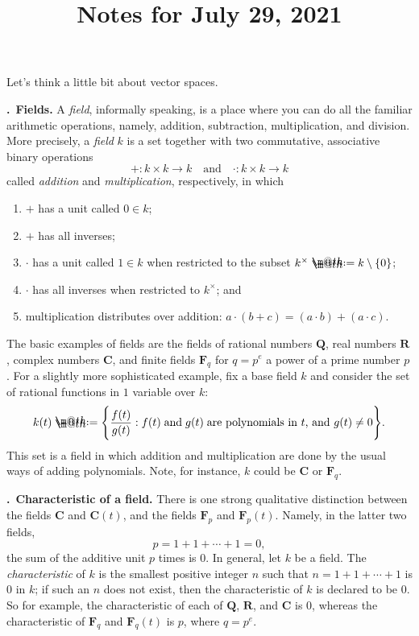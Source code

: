 \documentclass[11pt, noamsfonts]{amsart}
\title{Notes for July 29, 2021}
\makeatletter
\newcommand{\pointheader}{\vspace{2mm}\noindent\refstepcounter{section}\textbf{\thesection.}}
\newcommand{\bpoint}[1]{\pointheader~{\bf #1.}}
\newcommand*{\coloneqq}{\mathrel{\rlap{%
           \raisebox{0.3ex}{$\m@th\cdot$}}%
           \raisebox{-0.3ex}{$\m@th\cdot$}}%
           =}
\makeatother
\begin{document}
\maketitle

Let's think a little bit about vector spaces.

\bpoint{Fields}
A \emph{field}, informally speaking, is a place where you can do all the
familiar arithmetic operations, namely, addition, subtraction, multiplication,
and division. More precisely, a \emph{field} \(k\) is a set together with two
commutative, associative binary operations
\[
+ \colon k \times k \to k
\quad\text{and}\quad
\cdot \colon k \times k \to k
\]
called \emph{addition} and \emph{multiplication}, respectively, in which
\begin{enumerate}
\item \(+\) has a unit called \(0 \in k\);
\item \(+\) has all inverses;
\item \(\cdot\) has a unit called \(1 \in k\) when restricted to the subset
\(k^\times \coloneqq k \setminus \{0\}\);
\item \(\cdot\) has all inverses when restricted to \(k^\times\); and
\item multiplication distributes over addition: \(a \cdot (b + c) = (a \cdot b) + (a \cdot c)\).
\end{enumerate}
The basic examples of fields are the fields of rational numbers \(\mathbf{Q}\),
real numbers \(\mathbf{R}\), complex numbers \(\mathbf{C}\), and finite fields
\(\mathbf{F}_q\) for \(q = p^e\) a power of a prime number \(p\). For a slightly
more sophisticated example, fix a base field \(k\) and consider the set of
rational functions in \(1\) variable over \(k\):
\[
k(t) \coloneqq
\Bigg\{\frac{f(t)}{g(t)} :
f(t) \;\text{and}\; g(t) \;\text{are polynomials in \(t\), and \(g(t) \neq 0\)}\Bigg
\}.
\]
This set is a field in which addition and multiplication are done by the usual
ways of adding polynomials. Note, for instance, \(k\) could be \(\mathbf{C}\)
or \(\mathbf{F}_q\).

\bpoint{Characteristic of a field}
There is one strong qualitative distinction between the fields \(\mathbf{C}\)
and \(\mathbf{C}(t)\), and the fields \(\mathbf{F}_p\) and \(\mathbf{F}_p(t)\).
Namely, in the latter two fields,
\[ p = 1 + 1 + \cdots + 1 = 0, \]
the sum of the additive unit \(p\) times is \(0\). In general, let \(k\) be a
field. The \emph{characteristic} of \(k\) is the smallest positive integer
\(n\) such that \(n = 1 + 1 + \cdots + 1\) is \(0\) in \(k\); if such an \(n\)
does not exist, then the characteristic of \(k\) is declared to be \(0\).
So for example, the characteristic of each of \(\mathbf{Q}\), \(\mathbf{R}\),
and \(\mathbf{C}\) is \(0\), whereas the characteristic of \(\mathbf{F}_q\) and
\(\mathbf{F}_q(t)\) is \(p\), where \(q = p^e\).
\end{document}
